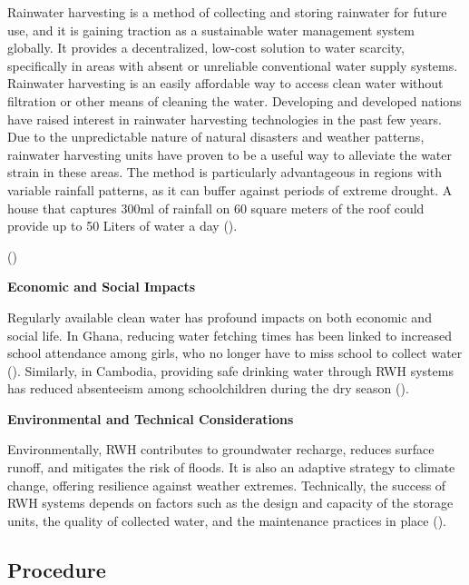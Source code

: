 \documentclass[10pt, twocolumn]{article}
\begin{document}
Rainwater harvesting is a method of collecting and storing rainwater for future use, and it is gaining traction as a sustainable water management system globally. It provides a decentralized, low-cost solution to water scarcity, specifically in areas with absent or unreliable conventional water supply systems. Rainwater harvesting is an easily affordable way to access clean water without filtration or other means of cleaning the water. Developing and developed nations have raised interest in rainwater harvesting technologies in the past few years. Due to the unpredictable nature of natural disasters and weather patterns, rainwater harvesting units have proven to be a useful way to alleviate the water strain in these areas. The method is particularly advantageous in regions with variable rainfall patterns, as it can buffer against periods of extreme drought. A house that captures 300ml of rainfall on 60 square meters of the roof could provide up to 50 Liters of water a day (\autocite{amos2018economic}).

(\autocite{kim2016community})

\textbf{Economic and Social Impacts}

Regularly available clean water has profound impacts on both economic and social life. In Ghana, reducing water fetching times has been linked to increased school attendance among girls, who no longer have to miss school to collect water (\autocite{Nauges2017}). Similarly, in Cambodia, providing safe drinking water through RWH systems has reduced absenteeism among schoolchildren during the dry season (\autocite{Cambodia_Water_Education}).

\textbf{Environmental and Technical Considerations}

Environmentally, RWH contributes to groundwater recharge, reduces surface runoff, and mitigates the risk of floods. It is also an adaptive strategy to climate change, offering resilience against weather extremes. Technically, the success of RWH systems depends on factors such as the design and capacity of the storage units, the quality of collected water, and the maintenance practices in place (\autocite{TZ_Water_Harvesting}).

\subsection{Procedure}
\end{document}
